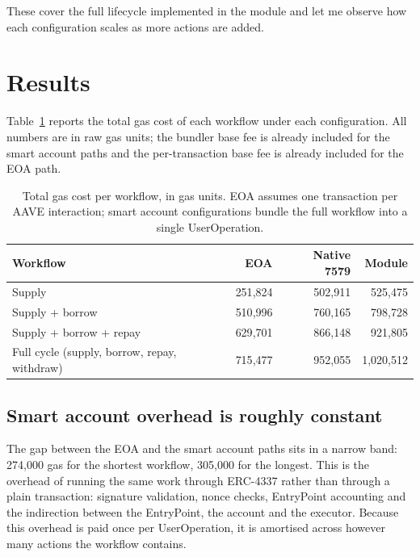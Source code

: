 These cover the full lifecycle implemented in the module and let me observe
how each configuration scales as more actions are added.

\section{Results}

Table~\ref{tab:gas-results} reports the total gas cost of each workflow under
each configuration. All numbers are in raw gas units; the bundler base fee is
already included for the smart account paths and the per-transaction base fee
is already included for the EOA path.

\begin{table}[ht]
\centering
\begin{tabular}{lrrr}
\hline
\textbf{Workflow} & \textbf{EOA} & \textbf{Native 7579} & \textbf{Module} \\
\hline
Supply                       &   251{,}824 &   502{,}911 &   525{,}475 \\
Supply + borrow              &   510{,}996 &   760{,}165 &   798{,}728 \\
Supply + borrow + repay      &   629{,}701 &   866{,}148 &   921{,}805 \\
Full cycle (supply, borrow, repay, withdraw) &   715{,}477 &   952{,}055 & 1{,}020{,}512 \\
\hline
\end{tabular}
\caption{Total gas cost per workflow, in gas units. EOA assumes one
transaction per AAVE interaction; smart account configurations bundle the
full workflow into a single UserOperation.}
\label{tab:gas-results}
\end{table}

\subsection{Smart account overhead is roughly constant}

The gap between the EOA and the smart account paths sits in a narrow band:
274{,}000 gas for the shortest workflow, 305{,}000 for the longest. This is
the overhead of running the same work through ERC-4337 rather than through a
plain transaction: signature validation, nonce checks, EntryPoint accounting
and the indirection between the EntryPoint, the account and the executor.
Because this overhead is paid once per UserOperation, it is amortised across
however many actions the workflow contains.

